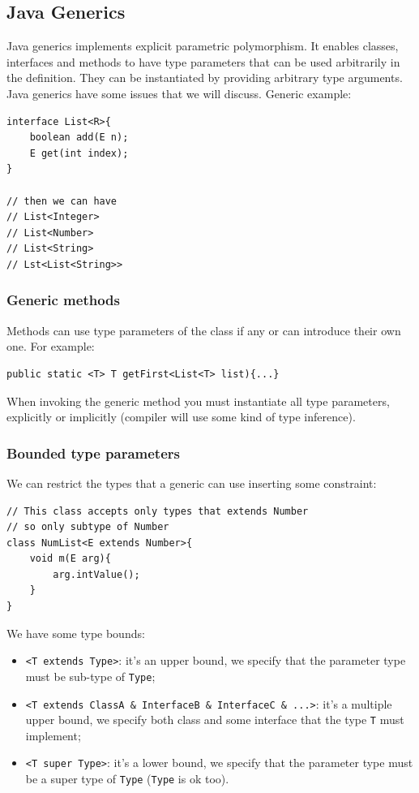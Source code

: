 \subsection{Java Generics}
Java generics implements explicit parametric polymorphism.
It enables classes, interfaces and methods to have type parameters that can be used arbitrarily in the definition.
They can be instantiated by providing arbitrary type arguments.
Java generics have some issues that we will discuss.
Generic example:
\begin{verbatim}
interface List<R>{
    boolean add(E n);
    E get(int index);
}

// then we can have
// List<Integer>
// List<Number>
// List<String>
// Lst<List<String>>
\end{verbatim}

\subsubsection{Generic methods}
Methods can use type parameters of the class if any or can introduce their own one.
For example:
\begin{verbatim}
public static <T> T getFirst<List<T> list){...}
\end{verbatim}
When invoking the generic method you must instantiate all type parameters, explicitly or implicitly (compiler will use some kind of type inference).

\subsubsection{Bounded type parameters}
We can restrict the types that a generic can use inserting some constraint:
\begin{verbatim}
// This class accepts only types that extends Number
// so only subtype of Number
class NumList<E extends Number>{
    void m(E arg){
        arg.intValue();
    }
}
\end{verbatim}

We have some type bounds:
\begin{itemize}
    \item \verb|<T extends Type>|: it's an upper bound, we specify that the parameter type must be sub-type of \verb|Type|;

    \item \verb|<T extends ClassA & InterfaceB & InterfaceC & ...>|: it's a multiple upper bound, we specify both class and some interface that the type \verb|T| must implement;

    \item \verb|<T super Type>|: it's a lower bound, we specify that the parameter type must be a super type of \verb|Type| (\verb|Type| is ok too). 
\end{itemize}

